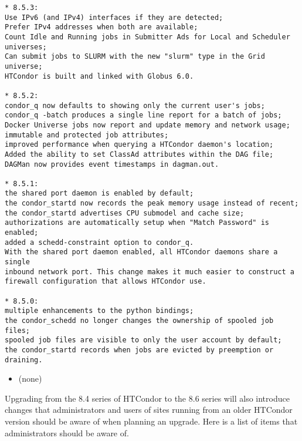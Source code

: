 \begin{verbatim}
* 8.5.3:
Use IPv6 (and IPv4) interfaces if they are detected;
Prefer IPv4 addresses when both are available;
Count Idle and Running jobs in Submitter Ads for Local and Scheduler universes;
Can submit jobs to SLURM with the new "slurm" type in the Grid universe;
HTCondor is built and linked with Globus 6.0.

* 8.5.2:
condor_q now defaults to showing only the current user's jobs;
condor_q -batch produces a single line report for a batch of jobs;
Docker Universe jobs now report and update memory and network usage;
immutable and protected job attributes;
improved performance when querying a HTCondor daemon's location;
Added the ability to set ClassAd attributes within the DAG file;
DAGMan now provides event timestamps in dagman.out.

* 8.5.1:
the shared port daemon is enabled by default;
the condor_startd now records the peak memory usage instead of recent;
the condor_startd advertises CPU submodel and cache size;
authorizations are automatically setup when "Match Password" is enabled;
added a schedd-constraint option to condor_q.
With the shared port daemon enabled, all HTCondor daemons share a single
inbound network port. This change makes it much easier to construct a
firewall configuration that allows HTCondor use.

* 8.5.0:
multiple enhancements to the python bindings;
the condor_schedd no longer changes the ownership of spooled job files;
spooled job files are visible to only the user account by default;
the condor_startd records when jobs are evicted by preemption or draining.
\end{verbatim}
\begin{itemize}

\item (none)

\end{itemize}

Upgrading from the 8.4 series of HTCondor to the 8.6 series will
also introduce changes that administrators and users of sites running from an older
HTCondor version should be aware of when planning an upgrade.
Here is a list of items that administrators should be aware of.

